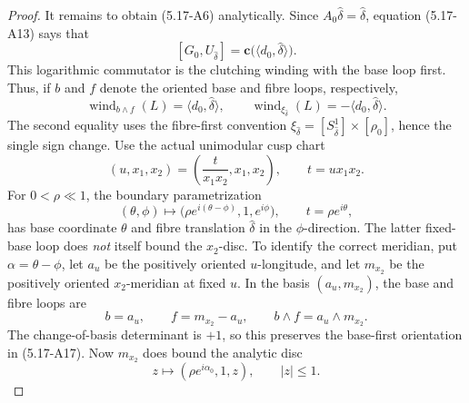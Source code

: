 \begin{proof}
It remains to obtain (5.17-A6) analytically.  Since
\(A_0\widehat\delta=\widehat\delta\), equation (5.17-A13) says that
\[
 [G_0,U_{\widehat\delta}]
 =\mathbf c\bigl(\langle d_0,\widehat\delta\rangle\bigr).
\tag{5.17-A16}
\]
This logarithmic commutator is the clutching winding with the base loop
first.  Thus, if \(b\) and \(f\) denote the oriented base and fibre loops,
respectively,
\[
 \operatorname{wind}_{b\wedge f}(L)
  =\langle d_0,\widehat\delta\rangle,
 \qquad
 \operatorname{wind}_{\xi_{\widehat\delta}}(L)
 =-\langle d_0,\widehat\delta\rangle.
\tag{5.17-A17}
\]
The second equality uses the fibre-first convention
\(\xi_{\widehat\delta}=[S^1_{\widehat\delta}]\times[\rho_0]\), hence the
single sign change.
Use the actual unimodular cusp chart
\[
 (u,x_1,x_2)=\left(\frac{t}{x_1x_2},x_1,x_2\right),
 \qquad t=ux_1x_2.
\tag{5.17-A18}
\]
For \(0<\rho\ll1\), the boundary parametrization
\[
 (\theta,\phi)\longmapsto
 \bigl(\rho e^{i(\theta-\phi)},1,e^{i\phi}\bigr),
 \qquad t=\rho e^{i\theta},
\tag{5.17-A19}
\]
has base coordinate \(\theta\) and fibre translation
\(\widehat\delta\) in the \(\phi\)-direction.  The latter fixed-base loop
does \emph{not} itself bound the \(x_2\)-disc.  To identify the correct
meridian, put \(\alpha=\theta-\phi\), let \(a_u\) be the positively
oriented \(u\)-longitude, and let \(m_{x_2}\) be the positively oriented
\(x_2\)-meridian at fixed \(u\).  In the basis
\((a_u,m_{x_2})\), the base and fibre loops are
\[
 b=a_u,
 \qquad
 f=m_{x_2}-a_u,
 \qquad
 b\wedge f=a_u\wedge m_{x_2}.
\tag{5.17-A19a}
\]
The change-of-basis determinant is \(+1\), so this preserves the
base-first orientation in (5.17-A17).  Now \(m_{x_2}\) does bound the
analytic disc
\[
 z\longmapsto(\rho e^{i\alpha_0},1,z),
 \qquad |z|\le1.
\tag{5.17-A19b}
\]


\end{proof}
